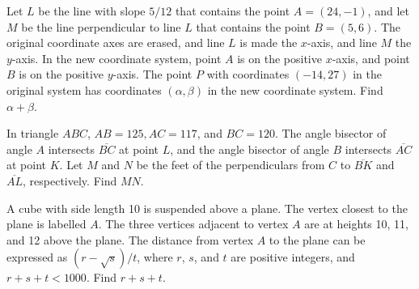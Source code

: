 \documentclass[11pt]{article}
\theoremstyle{definition}
\begin{document}
%	













\begin{question}[name={2011 AIME I, \href{https://artofproblemsolving.com/community/c4p2209666}{Problem 3}}]
	Let $L$ be the line with slope ${5}/{12}$ that contains the point $A=(24,-1)$, and let $M$ be the line perpendicular to line $L$ that contains the point $B=(5,6)$. The original coordinate axes are erased, and line $L$ is made the $x$-axis, and line $M$ the $y$-axis. In the new coordinate system, point $A$ is on the positive $x$-axis, and point $B$ is on the positive $y$-axis. The point $P$ with coordinates $(-14,27)$ in the original system has coordinates $(\alpha,\beta)$ in the new coordinate system. Find $\alpha+\beta$.
\end{question}


%	












\begin{question}[name={2011 AIME I, \href{https://artofproblemsolving.com/community/c4p2209675}{Problem 4}}]
	In triangle $ABC$, $AB=125,AC=117$, and $BC=120$. The angle bisector of angle $A$ intersects $\overline{BC}$ at point $L$, and the angle bisector of angle $B$ intersects $\overline{AC}$ at point $K$. Let $M$ and $N$ be the feet of the perpendiculars from $C$ to $\overline{BK}$ and $\overline{AL}$, respectively. Find $MN$.	
\end{question}


%	











\begin{question}[name={2011 AIME I, \href{https://artofproblemsolving.com/community/c4p2209733}{Problem 13}}]
	A cube with side length 10 is suspended above a plane. The vertex closest to the plane is labelled $A$. The three vertices adjacent to vertex $A$ are at heights 10, 11, and 12 above the plane. The distance from vertex $A$ to the plane can be expressed as $(r-\sqrt{s})/{t}$, where $r$, $s$, and $t$ are positive integers, and $r+s+t<1000$. Find $r+s+t$.
\end{question}
\end{document}
